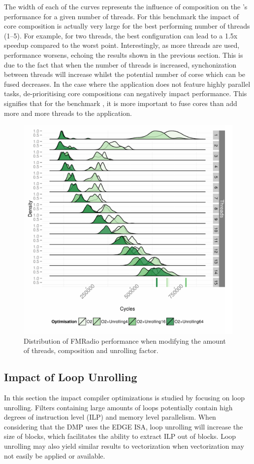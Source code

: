 The width of each of the curves represents the influence of composition on the 's performance for a given number of threads.
For this benchmark the impact of core composition is actually very large for the best performing number of threads (1--5).
For example, for two threads, the best configuration can lead to a 1.5x speedup compared to the worst point.
Interestingly, as more threads are used, performance worsens, echoing the results shown in the previous section.
This is due to the fact that when the number of threads is increased, synchonization between threads will increase whilst the potential number of corse which can be fused decreases.
In the case where the application does not feature highly parallel tasks, de-prioritising core compositions can negatively impact performance.
This signifies that for the benchmark , it is more important to fuse cores than add more and more threads to the application.


\begin{figure}
  \includegraphics[width=1\textwidth]{streamit-paper/graphics/unrolled_fm.pdf}
  \caption{Distribution of FMRadio performance when modifying the amount of threads, composition and unrolling factor.}\label{fig:fmunroll}
\end{figure}

\subsection{Impact of Loop Unrolling}
In this section the impact compiler optimizations is studied by focusing on loop unrolling.
Filters containing large amounts of loops potentially contain high degrees of instruction level (ILP) and memory level parallelism.
When considering that the DMP uses the EDGE ISA, loop unrolling will increase the size of blocks, which facilitates the ability to extract ILP out of blocks.
Loop unrolling may also yield similar results to vectorization when vectorization may not easily be applied or available.


